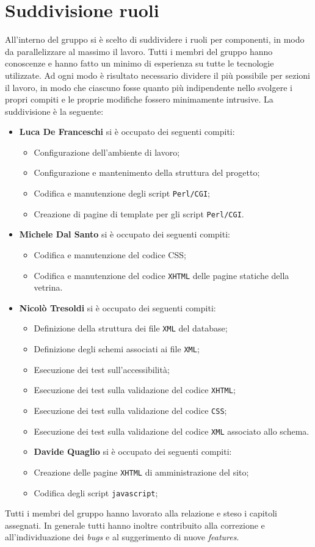\section{Suddivisione ruoli}

All'interno del gruppo si è scelto di suddividere i ruoli per componenti, in modo da parallelizzare al massimo il lavoro. Tutti i membri del gruppo hanno conoscenze e hanno fatto un minimo di esperienza su tutte le tecnologie utilizzate. Ad ogni modo è risultato necessario dividere il più possibile per sezioni il lavoro, in modo che ciascuno fosse quanto più indipendente nello svolgere i propri compiti e le proprie modifiche fossero minimamente intrusive. La suddivisione è la seguente:

\begin{itemize}
	\item \textbf{Luca De Franceschi} si è occupato dei seguenti compiti:
	\begin{itemize}
		\item Configurazione dell'ambiente di lavoro;
		\item Configurazione e mantenimento della struttura del progetto;
		\item Codifica e manutenzione degli script \texttt{Perl/CGI};
		\item Creazione di pagine di template per gli script \texttt{Perl/CGI}.
	\end{itemize}
	\item \textbf{Michele Dal Santo} si è occupato dei seguenti compiti:
	\begin{itemize}
		\item Codifica e manutenzione del codice CSS;
		\item Codifica e manutenzione del codice \texttt{XHTML} delle pagine statiche della vetrina.
	\end{itemize}
	\item \textbf{Nicolò Tresoldi} si è occupato dei seguenti compiti:
	\begin{itemize}
		\item Definizione della struttura dei file \texttt{XML} del database;
		\item Definizione degli schemi associati ai file \texttt{XML};
		\item Esecuzione dei test sull'accessibilità;
		\item Esecuzione dei test sulla validazione del codice \texttt{XHTML};
		\item Esecuzione dei test sulla validazione del codice \texttt{CSS};
		\item Esecuzione dei test sulla validazione del codice \texttt{XML} associato allo schema.
	\end{itemize}
	\begin{itemize}
	\item \textbf{Davide Quaglio} si è occupato dei seguenti compiti:
		\item Creazione delle pagine \texttt{XHTML} di amministrazione del sito;
		\item Codifica degli script \texttt{javascript};
	\end{itemize}
\end{itemize}

Tutti i membri del gruppo hanno lavorato alla relazione e steso i capitoli assegnati. In generale tutti hanno inoltre contribuito alla correzione e all'individuazione dei \textit{bugs} e al suggerimento di nuove \textit{features}.